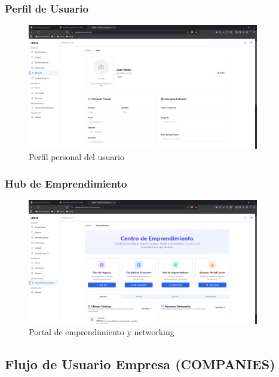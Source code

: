 \documentclass[12pt,a4paper]{article}
\begin{document}
\begin{enumerate}
\subsubsection{Perfil de Usuario}
\begin{figure}[H]
    \centering
    \includegraphics[width=0.9\textwidth]{screenshots/youth/profile.png}
    \caption{Perfil personal del usuario}
    \label{fig:youth-profile}
\end{figure}

\subsubsection{Hub de Emprendimiento}
\begin{figure}[H]
    \centering
    \includegraphics[width=0.9\textwidth]{screenshots/youth/entrepreneurship.png}
    \caption{Portal de emprendimiento y networking}
    \label{fig:youth-entrepreneurship}
\end{figure}

\subsection{Flujo de Usuario Empresa (COMPANIES)}


\end{enumerate}
\end{document}
